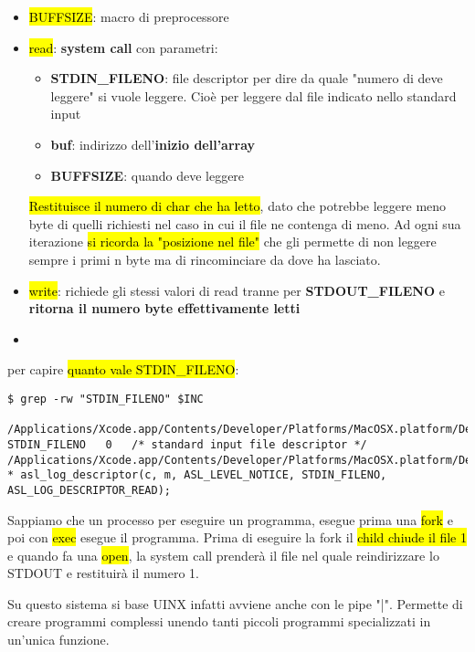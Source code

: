 \begin{itemize}
	\item \hl{BUFFSIZE}: macro di preprocessore
	\item \hl{read}: \textbf{system call} con parametri: 
	
		\begin{itemize}
			\item \textbf{STDIN\_FILENO}: file descriptor per dire da quale "numero di deve leggere" si vuole leggere. Cioè per leggere dal file indicato nello standard input
			\item \textbf{buf}: indirizzo dell'\textbf{inizio dell'array}
			\item \textbf{BUFFSIZE}: quando deve leggere
		\end{itemize}
		
		\hl{Restituisce il numero di char che ha letto}, dato che potrebbe leggere meno byte di quelli richiesti nel caso in cui il file ne contenga di meno. Ad ogni sua iterazione \hl{si ricorda la "posizione nel file"} che gli permette di non leggere sempre i primi n byte ma di rincominciare da dove ha lasciato.
	
	\item \hl{write}: richiede gli stessi valori di read tranne per \textbf{STDOUT\_FILENO} e \textbf{ritorna il numero byte effettivamente letti}
	\item 
\end{itemize}


per capire \hl{quanto vale STDIN\_FILENO}:


\begin{lstlisting}
$ grep -rw "STDIN_FILENO" $INC

/Applications/Xcode.app/Contents/Developer/Platforms/MacOSX.platform/Developer/SDKs/MacOSX.sdk/usr/include//unistd.h:#define	 STDIN_FILENO	0	/* standard input file descriptor */
/Applications/Xcode.app/Contents/Developer/Platforms/MacOSX.platform/Developer/SDKs/MacOSX.sdk/usr/include//asl.h: * asl_log_descriptor(c, m, ASL_LEVEL_NOTICE, STDIN_FILENO, ASL_LOG_DESCRIPTOR_READ);
\end{lstlisting}


Sappiamo che un processo per eseguire un programma, esegue prima una \hl{fork} e poi con \hl{exec} esegue il programma. Prima di eseguire la fork il \hl{child chiude il file 1} e quando fa una \hl{open}, la system call prenderà il file nel quale reindirizzare lo STDOUT e restituirà il numero 1.

Su questo sistema si base UINX infatti avviene anche con le pipe "|". Permette di creare programmi complessi unendo tanti piccoli programmi specializzati in un'unica funzione.


